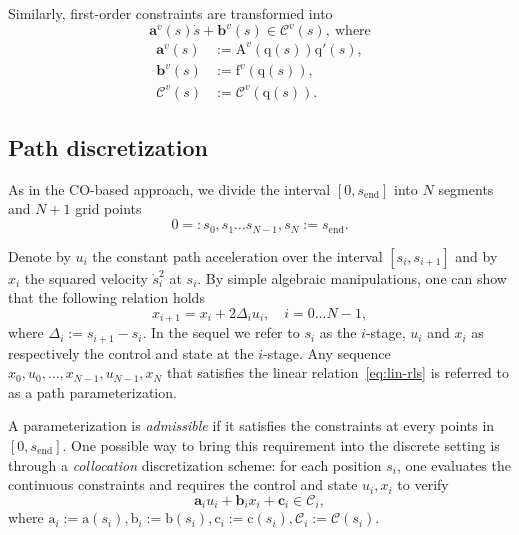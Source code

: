 \documentclass[journal]{IEEEtran}
\theoremstyle{plain}
\theoremstyle{definition}
\theoremstyle{definition}
\renewcommand{\vec}[1]{\bm{\mathrm{#1}}}  %
\newcommand{\cC}{\mathscr{C}}
\newcommand{\rmend}{\mathrm{end}}
\begin{document}

Similarly, first-order constraints are transformed into
\begin{equation}
  \label{eq:lp-in-path-direct}
  \mathbf{a}^v(s) \dot s + \mathbf{b}^v(s) \in \cC^v(s),\ \textrm{where}
\end{equation}
\begin{equation*}
  \begin{aligned}
    \mathbf{a}^v(s)&:=\vec A^v (\vec q (s)) \vec{q}'(s),\\
    \mathbf{b}^v(s)&:= \vec f^v (\vec q (s)),\\
    \cC^v(s) &:= \cC^v(\vec q(s)).
  \end{aligned}
\end{equation*}



\subsection{Path discretization}
\label{sec:discr-path-dynam}

As in the CO-based approach, we divide the interval
$[0, s_{\rmend}]$ into $N$ segments and $N+1$ grid points
\begin{equation*}
  0=:s_0, s_1 \dots s_{N-1}, s_N:= s_{\rmend}.
\end{equation*}

Denote by $u_i$ the constant path acceleration over the interval
$[s_i, s_{i+1}]$ and by $x_i$ the squared velocity $\dot s_i^2$ at
$s_i$. By simple algebraic manipulations, one can show that the
following relation holds
\begin{equation}
  \label{eq:lin-rls}
  x_{i+1} = x_i + 2 \Delta_i u_i, \quad i = 0\dots N-1,
\end{equation}
where $\Delta_i:= s_{i+1}-s_{i}$. In the sequel we refer to $s_i$ as
the $i$-stage, $u_i$ and $x_i$ as respectively the control and state
at the $i$-stage. Any sequence
$x_0, u_0, \dots, x_{N-1}, u_{N-1}, x_N$ that satisfies the linear
relation~\eqref{eq:lin-rls} is referred to as a path parameterization.

A parameterization is \emph{admissible} if it satisfies the
constraints at every points in $[0, s_{\rmend}]$. One possible way to
bring this requirement into the discrete setting is through a
\emph{collocation} discretization scheme: for each position $s_i$, one
evaluates the continuous constraints and requires the control and
state $u_i, x_i$ to verify
\begin{equation}
  \label{eq:gen-form}
    \mathbf{a}_i u_i + \mathbf{b}_i x_i+ \mathbf{c}_i \in \cC_i,
\end{equation}
where
$\vec a_i:=\vec a(s_i), \vec b_i:=\vec b(s_i), \vec c_i:=\vec c(s_i),
\cC_i:=\cC(s_i)$.
\end{document}

